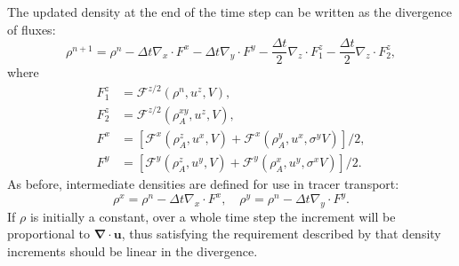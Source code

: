\documentclass{ametsocV6.1}
\begin{document}
The updated density at the end of the time step can be written as the divergence of fluxes:
\begin{equation}
    \rho^{n+1} = \rho^n - \Delta{t}\nabla_x \cdot F^x  - \Delta{t}\nabla_y \cdot F^y  - \frac{\Delta{t}}{2}\nabla_z \cdot F_1^z - \frac{\Delta{t}}{2}\nabla_z \cdot F_2^z,
\end{equation}
where
\begin{subequations}
\begin{align}
F_1^z & = \mathcal{F}^{z/2}(\rho^n,u^z,V), \\
F_2^z & = \mathcal{F}^{z/2}(\rho^{xy}_A,u^z,V), \\
F^x & = \left[ \mathcal{F}^x(\rho_A^z, u^x, V) + \mathcal{F}^x(\rho^y_A, u^x, \sigma^yV) \right]/2, \\
F^y & = \left[ \mathcal{F}^y(\rho_A^z, u^y, V) + \mathcal{F}^y(\rho^x_A, u^y, \sigma^xV)\right]/2.
\end{align}
\end{subequations}
As before, intermediate densities are defined for use in tracer transport:
\begin{equation}
\rho^x = \rho^{n} - \Delta{t} \nabla_x\cdot F^x, \quad
\rho^y = \rho^{n} - \Delta{t} \nabla_y\cdot F^y. 
\end{equation}
If $\rho$ is initially a constant, over a whole time step the increment will be proportional to $\bm{\nabla\cdot u}$, thus satisfying the requirement described by \citet{melvin2024mixed} that density increments should be linear in the divergence.
\end{document}
